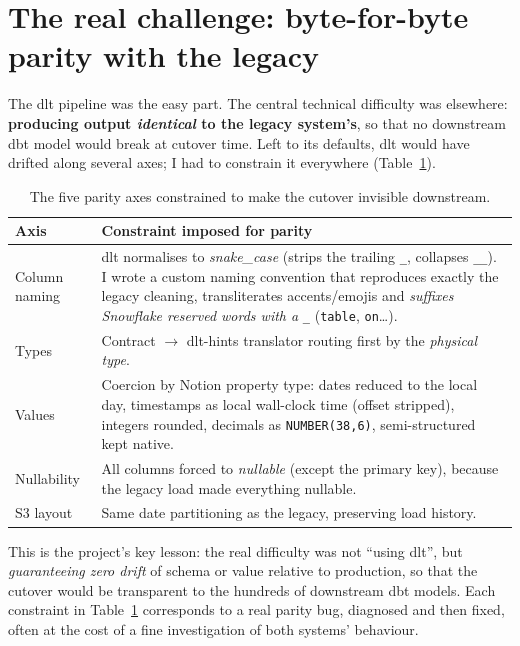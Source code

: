 \section{The real challenge: byte-for-byte parity with the legacy}

The dlt pipeline was the easy part. The central technical difficulty was elsewhere: \textbf{producing output \emph{identical} to the legacy system's}, so that no downstream dbt model would break at cutover time. Left to its defaults, dlt would have drifted along several axes; I had to constrain it everywhere (Table~\ref{tab:parity}).

\begin{table}[H]
\centering\small
\renewcommand{\arraystretch}{1.3}
\begin{tabularx}{\textwidth}{@{}p{2.9cm}X@{}}
\toprule
\textbf{Axis} & \textbf{Constraint imposed for parity} \\
\midrule
Column naming & dlt normalises to \emph{snake\_case} (strips the trailing \texttt{\_}, collapses \texttt{\_\_}). I wrote a custom naming convention that reproduces exactly the legacy cleaning, transliterates accents/emojis and \emph{suffixes Snowflake reserved words with a} \texttt{\_} (\texttt{table}, \texttt{on}\dots). \\
Types & Contract $\rightarrow$ dlt-hints translator routing first by the \emph{physical type}. \\
Values & Coercion by Notion property type: dates reduced to the local day, timestamps as local wall-clock time (offset stripped), integers rounded, decimals as \texttt{NUMBER(38,6)}, semi-structured kept native. \\
Nullability & All columns forced to \emph{nullable} (except the primary key), because the legacy load made everything nullable. \\
S3 layout & Same date partitioning as the legacy, preserving load history. \\
\bottomrule
\end{tabularx}
\caption{The five parity axes constrained to make the cutover invisible downstream.}
\label{tab:parity}
\end{table}

This is the project's key lesson: the real difficulty was not ``using dlt'', but \emph{guaranteeing zero drift} of schema or value relative to production, so that the cutover would be transparent to the hundreds of downstream dbt models. Each constraint in Table~\ref{tab:parity} corresponds to a real parity bug, diagnosed and then fixed, often at the cost of a fine investigation of both systems' behaviour.

